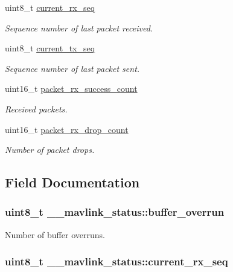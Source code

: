 \begin{DoxyCompactItemize}
uint8\+\_\+t \hyperlink{struct____mavlink__status_affbdd32b3dff8ae35327a79ed6b17646}{current\+\_\+rx\+\_\+seq}
\begin{DoxyCompactList}\small\item\em Sequence number of last packet received. \end{DoxyCompactList}\item 
uint8\+\_\+t \hyperlink{struct____mavlink__status_a06482d6c3fbfa829526c9b2e2e895f32}{current\+\_\+tx\+\_\+seq}
\begin{DoxyCompactList}\small\item\em Sequence number of last packet sent. \end{DoxyCompactList}\item 
uint16\+\_\+t \hyperlink{struct____mavlink__status_aa088f67773cdf9ff541c5880e65cee68}{packet\+\_\+rx\+\_\+success\+\_\+count}
\begin{DoxyCompactList}\small\item\em Received packets. \end{DoxyCompactList}\item 
uint16\+\_\+t \hyperlink{struct____mavlink__status_a1a1f510b9484e705c971f20fd1d61912}{packet\+\_\+rx\+\_\+drop\+\_\+count}
\begin{DoxyCompactList}\small\item\em Number of packet drops. \end{DoxyCompactList}\end{DoxyCompactItemize}


\subsection{Field Documentation}
\hypertarget{struct____mavlink__status_ae0ceb5a136021ee78c953f2e86d772cb}{
\subsubsection[{buffer\+\_\+overrun}]{\setlength{\rightskip}{0pt plus 5cm}uint8\+\_\+t \+\_\+\+\_\+mavlink\+\_\+status\+::buffer\+\_\+overrun}}\label{struct____mavlink__status_ae0ceb5a136021ee78c953f2e86d772cb}


Number of buffer overruns. 

\hypertarget{struct____mavlink__status_affbdd32b3dff8ae35327a79ed6b17646}{
\subsubsection[{current\+\_\+rx\+\_\+seq}]{\setlength{\rightskip}{0pt plus 5cm}uint8\+\_\+t \+\_\+\+\_\+mavlink\+\_\+status\+::current\+\_\+rx\+\_\+seq}}\label{struct____mavlink__status_affbdd32b3dff8ae35327a79ed6b17646}


